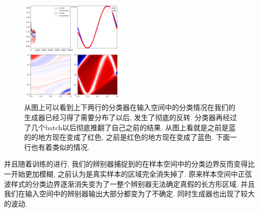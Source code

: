 \documentclass[lang=cn,11pt]{elegantpaper}
\begin{document}
\begin{figure}[hbt]
  \includegraphics[width=0.45\textwidth]{sin_3_4}
  \caption{从图上可以看到上下两行的分类器在输入空间中的分类情况在我们的生成器已经习得了需要分布了以后, 发生了彻底的反转. 分类器再经过了几个batch以后彻底推翻了自己之前的结果. 从图上看就是之前是蓝的的地方现在变成了红色, 之前是红色的地方现在变成了蓝色. 下面一行也有着类似的情况.}
\end{figure}

并且随着训练的进行, 我们的辨别器捕捉到的在样本空间中的分类边界反而变得比一开始更加模糊, 之前认为是真实样本的区域完全消失掉了. 原来样本空间中正弦波样式的分类边界逐渐消失变为了一整个辨别器无法确定真假的长方形区域. 并且我们在输入空间中的辨别器输出大部分都变为了不确定. 同时生成器也出现了较大的波动. 
\end{document}
